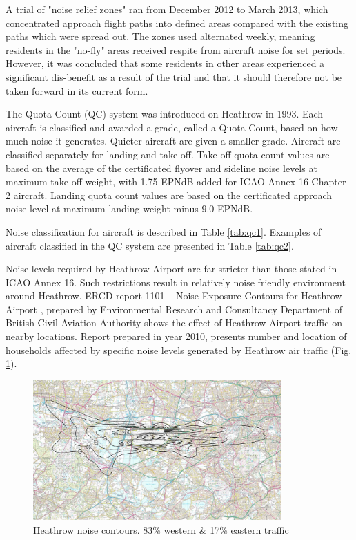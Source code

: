 A trial of "noise relief zones" ran from December 2012 to March 2013, which concentrated approach flight paths into defined areas compared with the existing paths which were spread out. The zones used alternated weekly, meaning residents in the "no-fly" areas received respite from aircraft noise for set periods. However, it was concluded that some residents in other areas experienced a significant dis-benefit as a result of the trial and that it should therefore not be taken forward in its current form.

The Quota Count (QC) system was introduced on Heathrow in 1993. Each aircraft is classified and awarded a grade, called a Quota Count, based on how much noise it generates. Quieter aircraft are given a smaller grade.  Aircraft are classified separately for landing and take-off. Take-off quota count values are based on the average of the certificated flyover and sideline noise levels at maximum take-off weight, with 1.75 EPNdB added for ICAO Annex 16 Chapter 2 aircraft. Landing quota count values are based on the certificated approach noise level at maximum landing weight minus 9.0 EPNdB.

Noise classification for aircraft is described in Table \ref{tab:qc1}. Examples of aircraft classified in the QC system are presented in Table \ref{tab:qc2}.

Noise levels required by Heathrow Airport are far stricter than those stated in ICAO Annex 16. Such restrictions result in relatively noise friendly environment around Heathrow. ERCD report 1101 – Noise Exposure Contours for Heathrow Airport \citep{ERCD}, prepared by Environmental Research and Consultancy Department of British Civil Aviation Authority shows the effect of Heathrow Airport traffic on nearby locations. Report prepared in year 2010, presents number and location of households affected by specific noise levels generated by Heathrow air traffic (Fig. \ref{heathrow}).

\begin{figure}[h!]
\centering %
\includegraphics[width=0.85\textwidth]{Pictures/heathrow.png}
\caption{Heathrow noise contours. 83\% western \& 17\% eastern traffic \citep{ERCD}}
\label{heathrow}
\end{figure}

